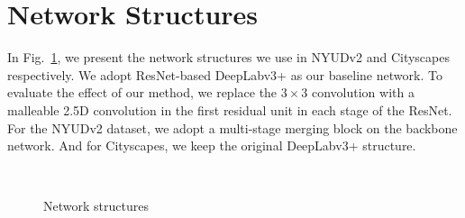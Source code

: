 \documentclass[runningheads]{llncs}
\begin{document}
\section{Network Structures}
In Fig.~\ref{fig:network_structure}, we present the network structures we use in NYUDv2 and Cityscapes respectively.
We adopt ResNet-based DeepLabv3+ as our baseline network.
To evaluate the effect of our method, we replace the $3\times3$ convolution with a malleable 2.5D convolution in the first residual unit in each stage of the ResNet.
For the NYUDv2 dataset, we adopt a multi-stage merging block on the backbone network.
And for Cityscapes, we keep the original DeepLabv3+ structure.

\begin{figure}[htbp]
  \centering
  \\
  \caption{
    Network structures
  }
  \label{fig:network_structure}
\end{figure}
\end{document}
